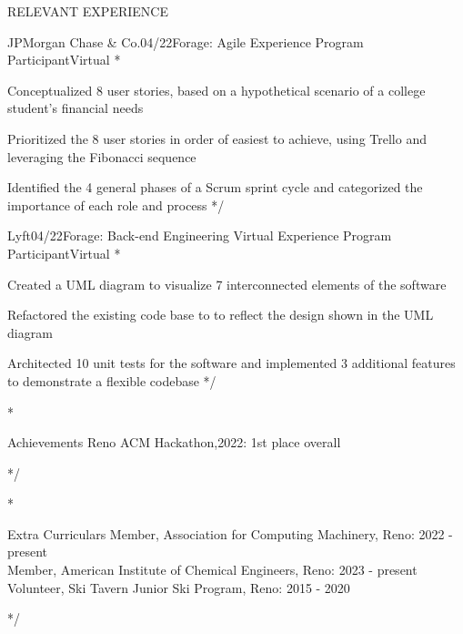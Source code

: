 \documentclass{resume} %
\begin{document}
\begin{rSection}{RELEVANT EXPERIENCE}


	\begin{rSubsection}{JPMorgan Chase \& Co.}{04/22}{Forage: Agile Experience Program Participant}{Virtual}
		\/*
		\item Conceptualized 8 user stories, based on a hypothetical scenario of a college student’s financial needs
		\item Prioritized the 8 user stories in order of easiest to achieve, using Trello and leveraging the Fibonacci sequence
		\item Identified the 4 general phases of a Scrum sprint cycle and categorized the importance of each role and process
		*/
	\end{rSubsection}

	\begin{rSubsection}{Lyft}{04/22}{Forage: Back-end Engineering Virtual Experience Program Participant}{Virtual}
		\/*
		\item Created a UML diagram to visualize 7 interconnected elements of the software
		\item Refactored the existing code base to to reflect the design shown in the UML diagram
		\item Architected 10 unit tests for the software and implemented 3 additional features to demonstrate a flexible codebase
		*/
	\end{rSubsection}

\end{rSection}


\/*
\begin{rSection}{Achievements}
	{Reno ACM Hackathon,2022: 1st place overall}
\end{rSection}
*/


\/*
\begin{rSection}{Extra Curriculars}
	{Member, Association for Computing Machinery, Reno: 2022 - present}\\
	{Member, American Institute of Chemical Engineers, Reno: 2023 - present}\\
	{Volunteer, Ski Tavern Junior Ski Program, Reno: 2015 - 2020}\\
\end{rSection}
*/

\end{document}
